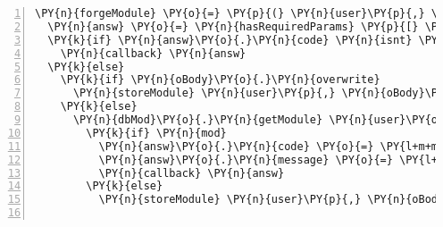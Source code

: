 \begin{Verbatim}[fontsize=\scriptsize,commandchars=\\\{\},numbers=left,firstnumber=1,stepnumber=1]
\PY{n}{forgeModule} \PY{o}{=} \PY{p}{(} \PY{n}{user}\PY{p}{,} \PY{n}{oBody}\PY{p}{,} \PY{n}{modType}\PY{p}{,} \PY{n}{dbMod}\PY{p}{,} \PY{n}{callback} \PY{p}{)} \PY{o}{=}\PY{o}{\PYZgt{}}
  \PY{n}{answ} \PY{o}{=} \PY{n}{hasRequiredParams} \PY{p}{[} \PY{l+s}{\PYZsq{}}\PY{l+s}{id}\PY{l+s}{\PYZsq{}}\PY{p}{,} \PY{l+s}{\PYZsq{}}\PY{l+s}{params}\PY{l+s}{\PYZsq{}}\PY{p}{,} \PY{l+s}{\PYZsq{}}\PY{l+s}{lang}\PY{l+s}{\PYZsq{}}\PY{p}{,} \PY{l+s}{\PYZsq{}}\PY{l+s}{data}\PY{l+s}{\PYZsq{}} \PY{p}{]}\PY{p}{,} \PY{n}{oBody}
  \PY{k}{if} \PY{n}{answ}\PY{o}{.}\PY{n}{code} \PY{n}{isnt} \PY{l+m+mi}{200}
    \PY{n}{callback} \PY{n}{answ}
  \PY{k}{else}
    \PY{k}{if} \PY{n}{oBody}\PY{o}{.}\PY{n}{overwrite}
      \PY{n}{storeModule} \PY{n}{user}\PY{p}{,} \PY{n}{oBody}\PY{p}{,} \PY{n}{modType}\PY{p}{,} \PY{n}{dbMod}\PY{p}{,} \PY{n}{callback}
    \PY{k}{else}
      \PY{n}{dbMod}\PY{o}{.}\PY{n}{getModule} \PY{n}{user}\PY{o}{.}\PY{n}{username}\PY{p}{,} \PY{n}{oBody}\PY{o}{.}\PY{n}{id}\PY{p}{,} \PY{p}{(} \PY{n}{err}\PY{p}{,} \PY{n}{mod} \PY{p}{)} \PY{o}{=}\PY{o}{\PYZgt{}}
        \PY{k}{if} \PY{n}{mod}
          \PY{n}{answ}\PY{o}{.}\PY{n}{code} \PY{o}{=} \PY{l+m+mi}{409}
          \PY{n}{answ}\PY{o}{.}\PY{n}{message} \PY{o}{=} \PY{l+s}{\PYZsq{}}\PY{l+s}{Module name already existing: }\PY{l+s}{\PYZsq{}} \PY{o}{+} \PY{n}{oBody}\PY{o}{.}\PY{n}{id}
          \PY{n}{callback} \PY{n}{answ}
        \PY{k}{else}
          \PY{n}{storeModule} \PY{n}{user}\PY{p}{,} \PY{n}{oBody}\PY{p}{,} \PY{n}{modType}\PY{p}{,} \PY{n}{dbMod}\PY{p}{,} \PY{n}{callback}


\end{Verbatim}
